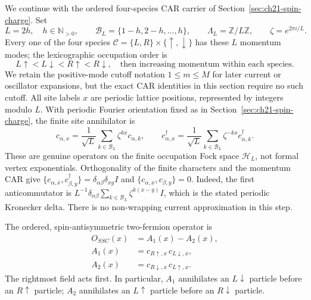 We continue with the ordered four-species CAR carrier of
Section~\ref{sec:ch21-spin-charge}.  Set
\begin{equation}
 L=2h,\quad h\in\mathbb N_{>0},\qquad
 \mathcal B_L=\{1-h,2-h,\ldots,h\},\qquad
 \Lambda_L=\mathbb Z/L\mathbb Z,\qquad
 \zeta=e^{2\pi i/L}.
 \label{eq:ch21-pair-setting}
\end{equation}
Every one of the four species
\(\mathcal C=\{L,R\}\times\{\uparrow,\downarrow\}\) has these \(L\)
momentum modes; the lexicographic occupation order is
\begin{equation}
 L\uparrow<L\downarrow<R\uparrow<R\downarrow,
 \quad\text{then increasing momentum within each species}.
 \label{eq:ch21-pair-order}
\end{equation}
We retain the positive-mode cutoff notation \(1\leq m\leq M\) for later
current or oscillator expansions, but the exact CAR identities in this
section require no such cutoff.  All site labels \(x\) are periodic lattice
positions, represented by integers modulo \(L\).  With periodic Fourier
orientation fixed as in Section~\ref{sec:ch21-spin-charge}, the finite site
annihilator is
\begin{equation}
 c_{\alpha,x}=\frac1{\sqrt L}\sum_{k\in\mathcal B_L}
        \zeta^{kx}c_{\alpha,k},\qquad
 c_{\alpha,x}^{\dagger}=\frac1{\sqrt L}\sum_{k\in\mathcal B_L}
        \zeta^{-kx}c_{\alpha,k}^{\dagger}.
 \label{eq:ch21-pair-site-field}
\end{equation}
These are genuine operators on the finite occupation Fock space
\(\mathcal H_L\), not formal vertex exponentials.  Orthogonality of the
finite characters and the momentum CAR give
\(\{c_{\alpha,x},c_{\beta,y}^{\dagger}\}
=\delta_{\alpha\beta}\delta_{xy}I\) and
\(\{c_{\alpha,x},c_{\beta,y}\}=0\).
Indeed, the first anticommutator is
\(L^{-1}\delta_{\alpha\beta}\sum_{k\in\mathcal B_L}
\zeta^{k(x-y)}I\), which is the stated periodic Kronecker delta.
There is no non-wrapping current approximation in this step.

\begin{definition}
\label{def:ch21-singlet}
The ordered, spin-antisymmetric two-fermion operator is
\begin{equation}
 \begin{split}
 O_{SSC}(x)&=A_1(x)-A_2(x),\\
 A_1(x)&=c_{R\uparrow,x}\,c_{L\downarrow,x},\\
 A_2(x)&=c_{R\downarrow,x}\,c_{L\uparrow,x}.
 \end{split}
 \label{eq:ch21-singlet-def}
\end{equation}
The rightmost field acts first.  In particular, \(A_1\) annihilates an
\(L\downarrow\) particle before an \(R\uparrow\) particle; \(A_2\)
annihilates an \(L\uparrow\) particle before an \(R\downarrow\) particle.
\end{definition}

